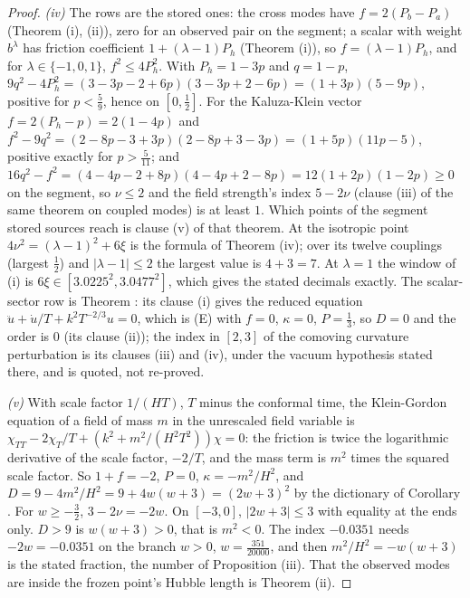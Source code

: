 \begin{proof}
\emph{(iv)} The rows are the stored ones: the cross modes have $f = 2(P_{b} - P_{a})$ (Theorem (i), (ii)), zero for an observed pair on the segment; a scalar with weight $b^{\lambda}$ has friction coefficient $1 + (\lambda - 1)P_{h}$ (Theorem (i)), so $f = (\lambda - 1)P_{h}$, and for $\lambda \in \{-1, 0, 1\}$, $f^{2} \le 4P_{h}^{2}$. With $P_{h} = 1 - 3p$ and $q = 1 - p$, $9q^{2} - 4P_{h}^{2} = (3 - 3p - 2 + 6p)(3 - 3p + 2 - 6p) = (1 + 3p)(5 - 9p)$, positive for $p < \tfrac59$, hence on $[0, \tfrac12]$. For the Kaluza-Klein vector $f = 2(P_{h} - p) = 2(1 - 4p)$ and $f^{2} - 9q^{2} = (2 - 8p - 3 + 3p)(2 - 8p + 3 - 3p) = (1 + 5p)(11p - 5)$, positive exactly for $p > \tfrac{5}{11}$; and $16q^{2} - f^{2} = (4 - 4p - 2 + 8p)(4 - 4p + 2 - 8p) = 12(1 + 2p)(1 - 2p) \ge 0$ on the segment, so $\nu \le 2$ and the field strength's index $5 - 2\nu$ (clause (iii) of the same theorem on coupled modes) is at least $1$. Which points of the segment stored sources reach is clause (v) of that theorem. At the isotropic point $4\nu^{2} = (\lambda - 1)^{2} + 6\xi$ is the formula of Theorem (iv); over its twelve couplings (largest $\tfrac12$) and $|\lambda - 1| \le 2$ the largest value is $4 + 3 = 7$. At $\lambda = 1$ the window of (i) is $6\xi \in [3.0225^{2}, 3.0477^{2}]$, which gives the stated decimals exactly. The scalar-sector row is Theorem : its clause (i) gives the reduced equation $\ddot u + \dot u/T + k^{2}T^{-2/3}u = 0$, which is (E) with $f = 0$, $\kappa = 0$, $P = \tfrac13$, so $D = 0$ and the order is $0$ (its clause (ii)); the index in $[2, 3]$ of the comoving curvature perturbation is its clauses (iii) and (iv), under the vacuum hypothesis stated there, and is quoted, not re-proved.

\emph{(v)} With scale factor $1/(HT)$, $T$ minus the conformal time, the Klein-Gordon equation of a field of mass $m$ in the unrescaled field variable is $\chi_{TT} - 2\chi_{T}/T + (k^{2} + m^{2}/(H^{2}T^{2}))\chi = 0$: the friction is twice the logarithmic derivative of the scale factor, $-2/T$, and the mass term is $m^{2}$ times the squared scale factor. So $1 + f = -2$, $P = 0$, $\kappa = -m^{2}/H^{2}$, and $D = 9 - 4m^{2}/H^{2} = 9 + 4w(w + 3) = (2w + 3)^{2}$ by the dictionary of Corollary . For $w \ge -\tfrac32$, $3 - 2\nu = -2w$. On $[-3, 0]$, $|2w + 3| \le 3$ with equality at the ends only. $D > 9$ is $w(w + 3) > 0$, that is $m^{2} < 0$. The index $-0.0351$ needs $-2w = -0.0351$ on the branch $w > 0$, $w = \tfrac{351}{20000}$, and then $m^{2}/H^{2} = -w(w + 3)$ is the stated fraction, the number of Proposition (iii). That the observed modes are inside the frozen point's Hubble length is Theorem (ii).


\end{proof}
